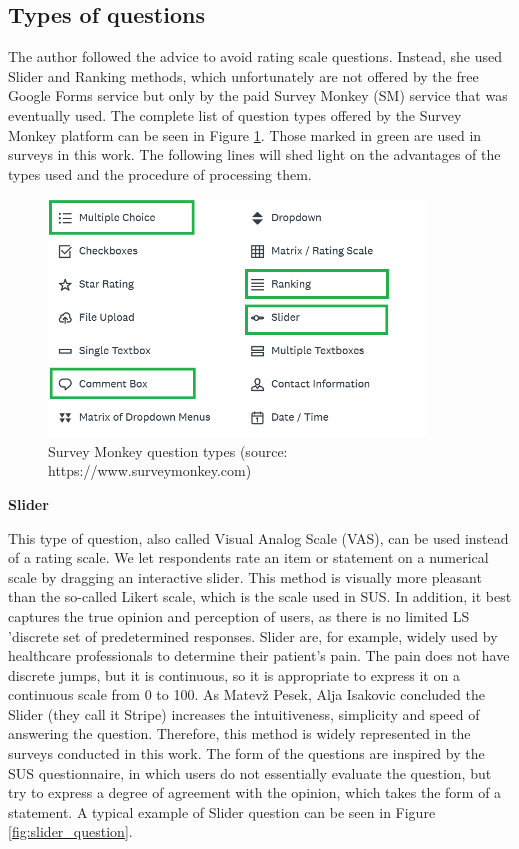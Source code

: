 \documentclass[a4paper,10pt,twoside]{article}
\begin{document}
\newpage
\vspace*{-1cm}
\subsection{Types of questions}

\noindent The author followed the advice to avoid rating scale questions. Instead, she used Slider and Ranking methods, which unfortunately are not offered by the free Google Forms service but only by the paid Survey Monkey (SM) service that was eventually used. The complete list of question types offered by the Survey Monkey platform can be seen in Figure \ref{fig:survey_monkey_options}. Those marked in green are used in surveys in this work. The following lines will shed light on the advantages of the types used and the procedure of processing them.

\vspace{0.3cm}
\begin{figure}[hbt!] 
\begin{center}
\includegraphics[width=10cm]{../pictures/survey_monkey_options.png} 
\caption[Survey Monkey answer types ]{Survey Monkey question types (source: https://www.surveymonkey.com)}
\label{fig:survey_monkey_options}
\end{center}
\end{figure}


\noindent \textbf {Slider}
\label{sec:slider}

\noindent This type of question, also called Visual Analog Scale (VAS), can be used instead of a rating scale. We let respondents rate an item or statement on a numerical scale by dragging an interactive slider. This method is visually more pleasant than the so-called Likert scale, which is the scale used in SUS. In addition, it best captures the true opinion and perception of users, as there is no limited LS 'discrete set of predetermined responses. Slider are, for example, widely used by healthcare professionals to determine their patient's pain. The pain does not have discrete jumps, but it is continuous, so it is appropriate to express it on a continuous scale from 0 to 100. As Matevž Pesek, Alja Isakovic concluded the Slider (they call it Stripe) increases the intuitiveness, simplicity and speed of answering the question. Therefore, this method is widely represented in the surveys conducted in this work. The form of the questions are inspired by the SUS questionnaire, in which users do not essentially evaluate the question, but try to express a degree of agreement with the opinion, which takes the form of a statement. A typical example of Slider question can be seen in Figure \ref{fig:slider_question}.
\end{document}
